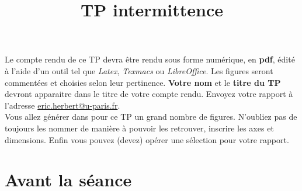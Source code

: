 \documentclass[12pt,a4]{article}
\begin{document}
\title{TP intermittence}

\maketitle

Le compte rendu de ce TP devra être rendu sous forme numérique, en \textbf{pdf},
édité à l'aide d'un outil tel que \textit{Latex}, \textit{Texmacs} ou \textit{LibreOffice}. Les figures seront
commentées et choisies selon leur pertinence.
\textbf{Votre nom} et le \textbf{titre du TP}  devront apparaitre dans le titre de votre compte rendu.
Envoyez votre rapport à l'adresse  \href{mailto:eric.herbert@u-paris.fr}{eric.herbert@u-paris.fr}. \\
Vous allez générer dans pour ce TP un grand nombre de figures. N'oubliez pas de toujours les nommer de manière à pouvoir les retrouver, inscrire les axes et dimensions. Enfin vous pouvez (devez) opérer une sélection pour votre rapport.


\part{Avant la séance}
\end{document}
